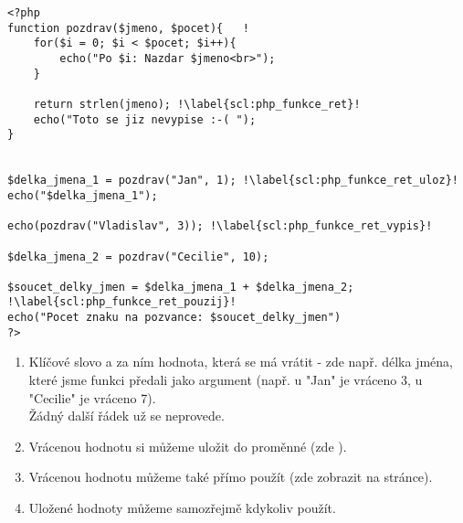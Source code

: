 \begin{minipage}[t]{.45\textwidth}
\begin{code}
\begin{verbatim}
<?php
function pozdrav($jmeno, $pocet){	!
	for($i = 0; $i < $pocet; $i++){
		echo("Po $i: Nazdar $jmeno<br>");
	}
	
	return strlen(jmeno); !\label{scl:php_funkce_ret}!
	echo("Toto se jiz nevypise :-( ");
}	
	
	
$delka_jmena_1 = pozdrav("Jan", 1); !\label{scl:php_funkce_ret_uloz}!
echo("$delka_jmena_1");

echo(pozdrav("Vladislav", 3)); !\label{scl:php_funkce_ret_vypis}!

$delka_jmena_2 = pozdrav("Cecilie", 10); 

$soucet_delky_jmen = $delka_jmena_1 + $delka_jmena_2; !\label{scl:php_funkce_ret_pouzij}!
echo("Pocet znaku na pozvance: $soucet_delky_jmen")
?>
\end{verbatim}

\label{code:php_funkce_return}
\end{code}
\end{minipage}
\begin{minipage}[t]{.45\textwidth}
\begin{enumerate}
\vspace{3.5cm}
\item[ř. \ref{scl:php_funkce_ret}:] Klíčové slovo  a za ním hodnota, která se má vrátit - zde např. délka jména, které jsme funkci předali jako argument (např. u "Jan"  je vráceno 3, u "Cecilie" je vráceno 7).\\ Žádný další řádek už se neprovede.
\item[ř. \ref{scl:php_funkce_ret_uloz}:] Vrácenou hodnotu si můžeme uložit do proměnné (zde ).
\vspace{1cm}
\item[ř. \ref{scl:php_funkce_ret_vypis}:] Vrácenou hodnotu můžeme také přímo použít (zde zobrazit na stránce).
\item[ř. \ref{scl:php_funkce_ret_pouzij}:] Uložené hodnoty můžeme samozřejmě kdykoliv použít.
\end{enumerate}
\end{minipage}




